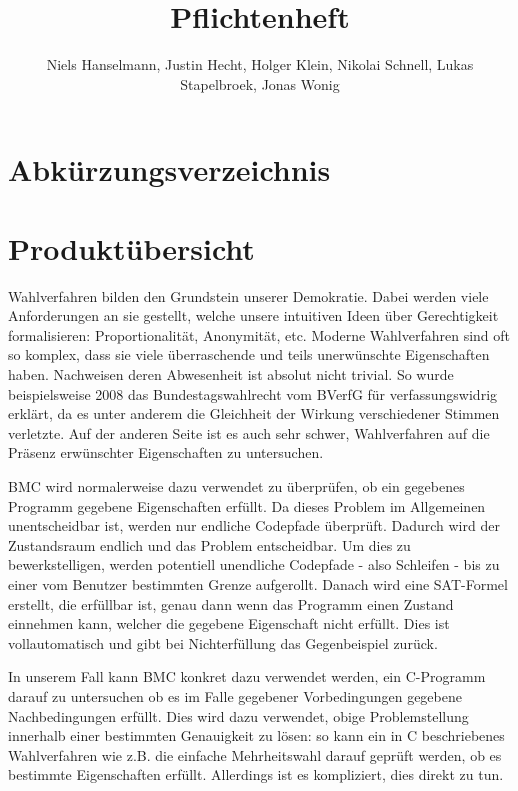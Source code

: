 \documentclass[a4paper]{scrreprt}
\begin{document}
\title{Pflichtenheft}
\author{Niels Hanselmann, Justin Hecht, Holger Klein, Nikolai Schnell, Lukas Stapelbroek, Jonas Wonig}
\maketitle 

\tableofcontents	

\listoffigures

\chapter*{Abkürzungsverzeichnis}
\begin{acronym} %
\end{acronym}
 
\chapter{Produktübersicht}
Wahlverfahren bilden den Grundstein unserer Demokratie. Dabei werden viele Anforderungen an sie gestellt, welche unsere intuitiven Ideen über Gerechtigkeit formalisieren: Proportionalität, Anonymität, etc. Moderne Wahlverfahren sind oft so komplex, dass sie viele überraschende und teils unerwünschte Eigenschaften haben. Nachweisen deren Abwesenheit ist absolut nicht trivial. So wurde beispielsweise 2008 das Bundestagswahlrecht vom BVerfG für verfassungswidrig erklärt, da es unter anderem die Gleichheit der Wirkung verschiedener Stimmen verletzte. Auf der anderen Seite ist es auch sehr schwer, Wahlverfahren auf die Präsenz erwünschter Eigenschaften zu untersuchen.

\ac{BMC} wird normalerweise dazu verwendet zu überprüfen, ob ein gegebenes Programm gegebene Eigenschaften erfüllt. Da dieses Problem im Allgemeinen unentscheidbar ist, werden nur endliche Codepfade überprüft. Dadurch wird der Zustandsraum endlich und das Problem entscheidbar. Um dies zu bewerkstelligen, werden potentiell unendliche Codepfade - also Schleifen - bis zu einer vom \gls{Benutzer} bestimmten Grenze aufgerollt. Danach wird eine SAT-Formel erstellt, die erfüllbar ist, genau dann wenn das Programm einen Zustand einnehmen kann, welcher die gegebene Eigenschaft nicht erfüllt. Dies ist vollautomatisch und gibt bei Nichterfüllung das Gegenbeispiel zurück.  

In unserem Fall kann \ac{BMC} konkret dazu verwendet werden, ein C-Programm darauf zu untersuchen ob es im Falle gegebener Vorbedingungen gegebene Nachbedingungen erfüllt. Dies wird dazu verwendet, obige Problemstellung innerhalb einer bestimmten Genauigkeit zu lösen: so kann ein in C beschriebenes Wahlverfahren wie z.B. die einfache Mehrheitswahl darauf geprüft werden, ob es bestimmte Eigenschaften erfüllt. Allerdings ist es kompliziert, dies direkt zu tun. 
\end{document}
